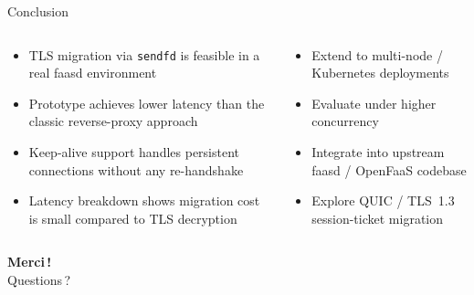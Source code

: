 \documentclass[aspectratio=169]{beamer}
\begin{document}
\begin{frame}{Conclusion}
  \begin{columns}[T]
    \begin{tcolorbox}[infocard, title=Summary]
      \begin{itemize}\setlength\itemsep{4pt}\small
        \item TLS migration via \texttt{sendfd} is feasible in a real faasd environment
        \item Prototype achieves lower latency than the classic reverse-proxy approach
        \item Keep-alive support handles persistent connections without any re-handshake
        \item Latency breakdown shows migration cost is small compared to TLS decryption
      \end{itemize}
    \end{tcolorbox}
    \begin{tcolorbox}[challengecard, title=Future Work]
      \begin{itemize}\setlength\itemsep{4pt}\small
        \item Extend to multi-node / Kubernetes deployments
        \item Evaluate under higher concurrency
        \item Integrate into upstream faasd / OpenFaaS codebase
        \item Explore QUIC / TLS~1.3 session-ticket migration
      \end{itemize}
    \end{tcolorbox}
  \end{columns}
\end{frame}

\begin{frame}[plain]
  \vfill
  \centering
  {\Huge\bfseries Merci\,!}\\[18pt]
  {\large Questions\,?}
  \vfill
\end{frame}
\end{document}
